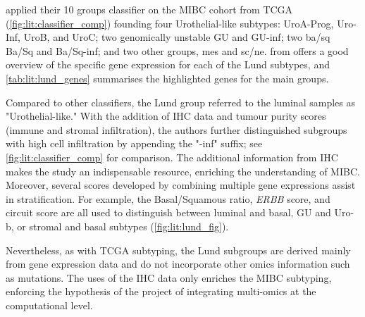 \citeauthor{Marzouka2018-ge} applied their 10 groups classifier on the MIBC cohort from TCGA (\cref{fig:lit:classifier_comp}) founding four Urothelial-like subtypes: UroA-Prog, Uro-Inf, UroB, and UroC; two genomically unstable GU and GU-inf; two \acrfull{ba/sq}  Ba/Sq and Ba/Sq-inf; and two other groups, \acrfull{mes} and \acrfull{sc/ne}.  from \citet{Marzouka2018-ge} offers a good overview of the specific gene expression for each of the Lund subtypes, and \cref{tab:lit:lund_genes} summarises the highlighted genes for the main groups.

Compared to other classifiers, the Lund group referred to the luminal samples as "Urothelial-like." With the addition of IHC data and tumour purity scores (immune and stromal infiltration), the authors further distinguished subgroups with high cell infiltration by appending the "-inf" suffix; see \cref{fig:lit:classifier_comp} for comparison. The additional information from IHC makes the study an indispensable resource, enriching the understanding of MIBC. Moreover, several scores developed by combining multiple gene expressions assist in stratification. For example, the Basal/Squamous ratio, \textit{ERBB} score, and circuit score are all used to distinguish between luminal and basal, GU and Uro-b, or stromal and basal subtypes (\cref{fig:lit:lund_fig}).

Nevertheless, as with TCGA subtyping, the Lund subgroups are derived mainly from gene expression data and do not incorporate other omics information such as mutations. The uses of the IHC data only enriches the MIBC subtyping, enforcing the hypothesis of the project of integrating multi-omics at the computational level.

